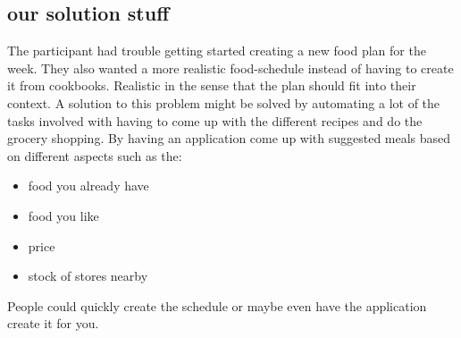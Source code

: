 \subsection{our solution stuff}
The participant had trouble getting started creating a new food plan for the week. They also wanted a more realistic food-schedule instead of having to create it from cookbooks. Realistic in the sense that the plan should fit into their context. A solution to this problem might be solved by automating a lot of the tasks involved with having to come up with the different recipes and do the grocery shopping.
By having an application come up with suggested meals based on different aspects such as the:
\begin{itemize}
\item food you already have
\item food you like
\item price
\item stock of stores nearby
\end{itemize}
People could quickly create the schedule or maybe even have the application create it for you.